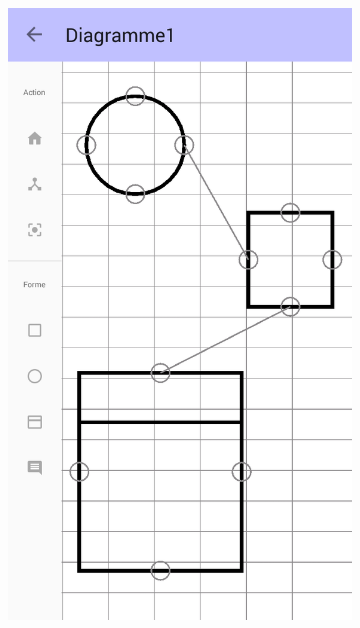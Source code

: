 \begin{itemize}
		\vspace*{\fill}
		\begin{figure}[!h]
			\centering
			\begin{subfigure}[t]{.3\textwidth}
				\includegraphics[width=\textwidth]{img/screen/new/colladia_draw_view_menu_main}
			\end{subfigure}
			~
			\begin{subfigure}[t]{.3\textwidth}

\end{subfigure}
\end{figure}
\end{itemize}
